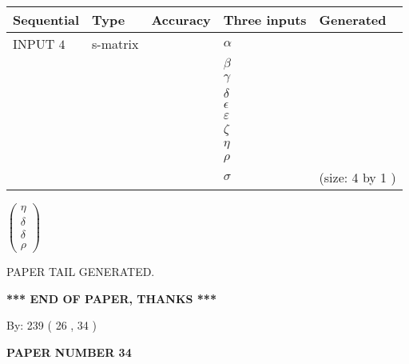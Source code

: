\documentclass[12pt]{article}
\begin{document}
  
\noindent\begin{tabular}{|l|l|l|l|l|}
\hline
 Sequential & Type & Accuracy & Three inputs & Generated \\ 
\hline
 
 
  INPUT $  4 $ & s-matrix & & 
 $  \alpha $ & 
  \\
  & & & 
 $  \beta $ & 
  \\
  & & & 
 $  \gamma $ & 
  \\
  & & & 
 $  \delta $ & 
  \\
  & & & 
 $  \epsilon $ & 
  \\
  & & & 
 $  \varepsilon $ & 
  \\
  & & & 
 $                     \zeta $ & 
  \\
  & & & 
 $  \eta $ & 
  \\
  & & & 
 $  \rho $ & 
  \\
  & & & 
 $  \sigma $ & 
  (size:  4  by  1 )
 \\  \hline  
 \end{tabular}
   
   
 $  \left( \begin{array}
 {
 c
 }
 \eta \\ 
 \delta \\ 
 \delta \\ 
 \rho
 \end{array} \right) $ 
   
   
   
   
 \vspace{0.2in}
 
   
   
\vspace{2.0in} PAPER TAIL GENERATED.
   
   
   
   
\vspace{1.0in} 
{\textbf{\large{ *** END OF PAPER, THANKS *** }}} 
   
   
\hspace{1.0in} By: 
 239 ( 26 ,  34 )
   
   
   
   
\newpage 
\setcounter{page}{ 
    34001 } 
   
   
   
   
 {\textbf{ \Large{ PAPER NUMBER  34  }}}
   
   
\vspace{0.2in}
   
   
   
\end{document}
